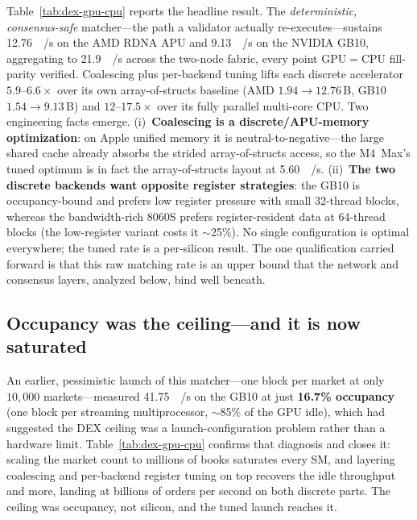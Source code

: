 Table~\ref{tab:dex-gpu-cpu} reports the headline result. The \emph{deterministic, consensus-safe}
matcher---the path a validator actually re-executes---sustains \SI{12.76}{\giga{}/
\second} on the AMD RDNA APU and \SI{9.13}{\giga{}/\second} on the NVIDIA GB10,
aggregating to \SI{21.9}{\giga{}/\second} across the two-node fabric, every point
GPU$=$CPU fill-parity verified. Coalescing plus per-backend tuning lifts each discrete accelerator
$5.9$--$6.6\times$ over its own array-of-structs baseline (AMD $1.94\to12.76$\,B, GB10
$1.54\to9.13$\,B) and $12$--$17.5\times$ over its fully parallel multi-core CPU. Two engineering
facts emerge. (i)~\textbf{Coalescing is a discrete/APU-memory optimization}: on Apple unified
memory it is neutral-to-negative---the large shared cache already absorbs the strided
array-of-structs access, so the M4~Max's tuned optimum is in fact the array-of-structs layout at
\SI{5.60}{\giga{}/\second}. (ii)~\textbf{The two discrete backends want opposite
register strategies}: the GB10 is occupancy-bound and prefers low register pressure with small
32-thread blocks, whereas the bandwidth-rich 8060S prefers register-resident data at 64-thread
blocks (the low-register variant costs it $\sim$25\%). No single configuration is optimal
everywhere; the tuned rate is a per-silicon result. The one qualification carried forward is that
this raw matching rate is an upper bound that the network and consensus layers, analyzed below,
bind well beneath.

\subsection{Occupancy was the ceiling---and it is now saturated}
\label{sec:production-occupancy}

An earlier, pessimistic launch of this matcher---one block per market at only
$10{,}000$ markets---measured \SI{41.75}{\mega{}/\second} on the GB10 at just
\textbf{16.7\% occupancy} (one block per streaming multiprocessor, $\sim$85\% of the GPU idle),
which had suggested the DEX ceiling was a launch-configuration problem rather than a hardware
limit. Table~\ref{tab:dex-gpu-cpu} confirms that diagnosis and closes it: scaling the market
count to millions of books saturates every SM, and layering coalescing and per-backend register
tuning on top recovers the idle throughput and more, landing at billions of orders per second on
both discrete parts. The ceiling was occupancy, not silicon, and the tuned launch reaches it.

